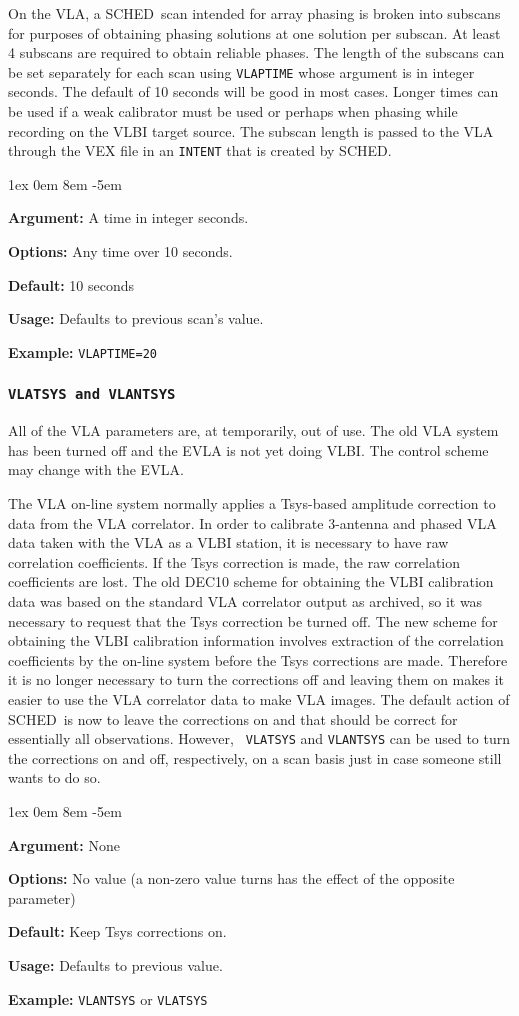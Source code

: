 \documentclass{report}
\newcommand{\sched}{{\sc SCHED}}
\newcommand{\schedb}{{\sc SCHED~}}
\newcommand{\rcwbox}[5]{
  \begin{list}{}{\parsep 1ex  \itemsep 0em
                 \leftmargin 8em  \itemindent -5em }
    \item {\bf Argument:} #1
    \item {\bf Options:}  #2
    \item {\bf Default:}  #3
    \item {\bf Usage:}    #4
    \item {\bf Example:}  #5
  \end{list}
}
\begin{document}
On the VLA, a \schedb scan intended for array phasing is broken into
subscans for purposes of obtaining phasing solutions at one solution
per subscan.  At least 4 subscans are required to obtain reliable
phases.  The length of the subscans can be set separately for each
scan using {\tt VLAPTIME} whose argument is in integer seconds.  The default
of 10 seconds will be good in most cases.  Longer times can be used if
a weak calibrator must be used or perhaps when phasing while recording
on the VLBI target source.  The subscan length is passed to the VLA 
through the VEX file in an {\tt INTENT} that is created by \sched.

\rcwbox
{A time in integer seconds.}
{Any time over 10 seconds.}
{10 seconds}
{Defaults to previous scan's value.}
{{\tt VLAPTIME=20}}



\subsubsection{\label{MP:VLATSYS}{\tt VLATSYS and VLANTSYS}}

All of the VLA parameters are, at temporarily, out of use.  The old
VLA system has been turned off and the EVLA is not yet doing VLBI.
The control scheme may change with the EVLA.

The VLA on-line system normally applies a
Tsys-based amplitude correction to data from the VLA correlator.  In
order to calibrate 3-antenna and phased VLA data taken with the VLA as
a VLBI station, it is necessary to have raw correlation coefficients.
If the Tsys correction is made, the raw correlation coefficients are
lost. The old DEC10 scheme for obtaining the VLBI calibration data was
based on the standard VLA correlator output as archived, so it was
necessary to request that the Tsys correction be turned off. The new
scheme for obtaining the VLBI calibration information involves
extraction of the correlation coefficients by the on-line system
before the Tsys corrections are made. Therefore it is no longer
necessary to turn the corrections off and leaving them on makes it
easier to use the VLA correlator data to make VLA images. The default
action of \schedb is now to leave the corrections on and that
should be correct for essentially all observations. However, {\tt
VLATSYS} and {\tt VLANTSYS} can be used to turn the corrections on and
off, respectively, on a scan basis just in case someone still wants to
do so.

\rcwbox
{None}
{No value (a non-zero value turns has the effect of the opposite
parameter)}
{Keep Tsys corrections on.}
{Defaults to previous value.}
{{\tt VLANTSYS} or {\tt VLATSYS}}
\end{document}

